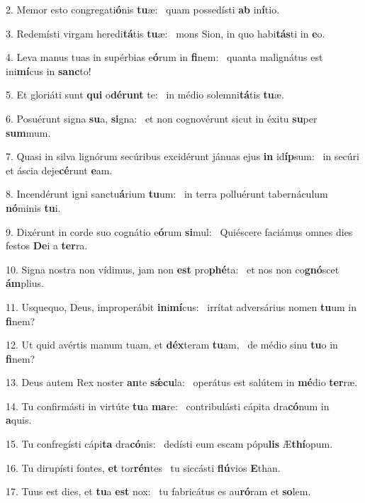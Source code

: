2. Memor esto congregati\textbf{ó}nis \textbf{tu}æ: \ast\  quam possedísti \textbf{ab} in\textbf{í}tio.\

3. Redemísti virgam heredi\textbf{tá}tis \textbf{tu}æ: \ast\  mons Sion, in quo habi\textbf{tás}ti in \textbf{e}o.\

4. Leva manus tuas in supérbias e\textbf{ó}rum in \textbf{fi}nem: \ast\  quanta malignátus est ini\textbf{mí}cus in \textbf{sanc}to!\

5. Et gloriáti sunt \textbf{qui} o\textbf{dé}\textbf{runt} te: \ast\  in médio solemni\textbf{tá}tis \textbf{tu}æ.\

6. Posuérunt signa \textbf{su}a, \textbf{si}gna: \ast\  et non cognovérunt sicut in éxitu \textbf{su}per \textbf{sum}mum.\

7. Quasi in silva lignórum secúribus excidérunt jánuas ejus \textbf{in} id\textbf{íp}sum: \ast\  in secúri et áscia deje\textbf{cé}runt \textbf{e}am.\

8. Incendérunt igni sanctu\textbf{á}rium \textbf{tu}um: \ast\  in terra polluérunt tabernáculum \textbf{nó}minis \textbf{tu}i.\

9. Dixérunt in corde suo cognátio e\textbf{ó}rum \textbf{si}mul: \ast\  Quiéscere faciámus omnes dies festos \textbf{De}i a \textbf{ter}ra.\

10. Signa nostra non vídimus, jam non \textbf{est} pro\textbf{phé}ta: \ast\  et nos non co\textbf{gnó}scet \textbf{ám}plius.\

11. Usquequo, Deus, improperábit \textbf{in}i\textbf{mí}cus: \ast\  irrítat adversárius nomen \textbf{tu}um in \textbf{fi}nem?\

12. Ut quid avértis manum tuam, et \textbf{déx}teram \textbf{tu}am, \ast\  de médio sinu \textbf{tu}o in \textbf{fi}nem?\

13. Deus autem Rex noster \textbf{an}te \textbf{sǽ}\textbf{cu}la: \ast\  operátus est salútem in \textbf{mé}dio \textbf{ter}ræ.\

14. Tu confirmásti in virtúte \textbf{tu}a \textbf{ma}re: \ast\  contribulásti cápita dra\textbf{có}num in \textbf{a}quis.\

15. Tu confregísti cápi\textbf{ta} dra\textbf{có}nis: \ast\  dedísti eum escam pópu\textbf{lis} Æ\textbf{thí}opum.\

16. Tu dirupísti fontes, \textbf{et} tor\textbf{rén}tes \ast\  tu siccásti \textbf{flú}vios \textbf{E}than.\

17. Tuus est dies, et \textbf{tu}a \textbf{est} nox: \ast\  tu fabricátus es au\textbf{ró}ram et \textbf{so}lem.\

